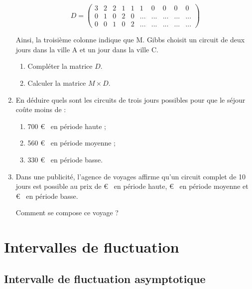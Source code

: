 \begin{spacing}{1.2}
\begin{enumerate}[\bf 1.]
\[D=\begin{pmatrix}
3&2&2&1&1&1&0&0&0&0\\
0&1&0&2&0&...&...&...&...&...\\
0&0&1&0&2&...&...&...&...&...
\end{pmatrix}\]

Ainsi, la troisième colonne indique que M. Gibbs choisit un circuit de deux jours dans la ville A et un jour dans la ville C.

	\begin{enumerate}[\bf a.]
	\item Compléter la matrice $D$.
	
	\item Calculer la matrice $M\times D$.
	
	\end{enumerate}
\item En déduire quels sont les circuits de trois jours possibles pour que le séjour coûte moins de :
	\begin{enumerate}[\bf a.]
	\item 700 \euro~ en période haute ;
	
	\item 560 \euro~ en période moyenne ;
	
	\item 330 \euro~ en période basse.
	
	\end{enumerate}

\item Dans une publicité, l'agence de voyages affirme qu'un circuit complet de 10 jours est possible au prix de  \euro~ en période haute,  \euro~ en période moyenne et  \euro~ en période basse.

Comment se compose ce voyage ?

\end{enumerate}



\newpage
\section{Intervalles de fluctuation}

\subsection{Intervalle de fluctuation asymptotique}


\end{spacing}
